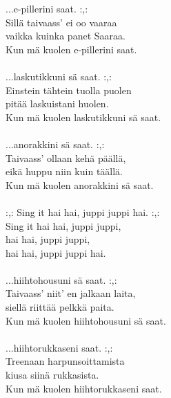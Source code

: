            ...e-pillerini saat. :,: \\
            Sillä taivaass' ei oo vaaraa \\
            vaikka kuinka panet Saaraa. \\
            Kun mä kuolen e-pillerini saat. \\
\hspace{10mm} \\
            ...laskutikkuni sä saat. :,: \\
            Einstein tähtein tuolla puolen \\
            pitää laskuistani huolen. \\
            Kun mä kuolen laskutikkuni sä saat. \\
\hspace{10mm} \\
            ...anorakkini sä saat. :,: \\
            Taivaass’ ollaan kehä päällä, \\
            eikä huppu niin kuin täällä. \\
            Kun mä kuolen anorakkini sä saat. \\
\hspace{10mm} \\
            :,: Sing it hai hai, juppi juppi hai. :,: \\
            Sing it hai hai, juppi juppi, \\
            hai hai, juppi juppi, \\
            hai hai, juppi juppi hai. \\
\hspace{10mm} \\
            ...hiihtohousuni sä saat. :,: \\
            Taivaass’ niit’ en jalkaan laita, \\
            siellä riittää pelkkä paita. \\
            Kun mä kuolen hiihtohousuni sä saat. \\
\hspace{10mm} \\
            ...hiihtorukkaseni saat. :,: \\
            Treenaan harpunsoittamista \\
            kiusa siinä rukkasista. \\
            Kun mä kuolen hiihtorukkaseni saat. \\
\hspace{10mm} \\
